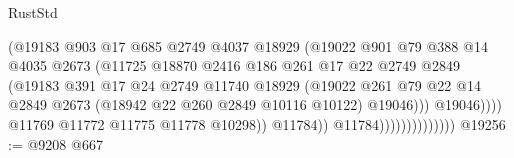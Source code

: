 \begin{lexlean}{RustStd}
\begin{coremodule}
                                            (@19183
                                              @903
                                              @17
                                              @685
                                              @2749
                                              @4037
                                              @18929
                                              (@19022
                                                @901
                                                @79
                                                @388
                                                @14
                                                @4035
                                                @2673
                                                (@11725
                                                  @18870
                                                  @2416
                                                  @186
                                                  @261
                                                  @17
                                                  @22
                                                  @2749
                                                  @2849
                                                  (@19183
                                                    @391
                                                    @17
                                                    @24
                                                    @2749
                                                    @11740
                                                    @18929
                                                    (@19022
                                                      @261
                                                      @79
                                                      @22
                                                      @14
                                                      @2849
                                                      @2673
                                                      (@18942 @22 @260 @2849 @10116 @10122)
                                                      @19046)))
                                                @19046))))
                                        @11769
                                        @11772
                                        @11775
                                        @11778
                                        @10298))
                                    @11784))
                                @11784))))))))))))))
@19256 := @9208 @667

\end{coremodule}
\end{lexlean}
